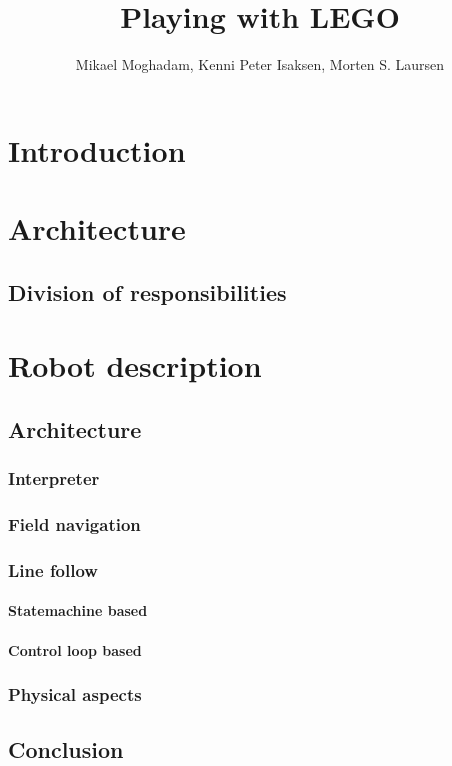 \documentclass[draft, english, a4paper]{article}
\title{Playing with LEGO}
\author{Mikael Moghadam, Kenni Peter Isaksen, Morten S. Laursen}
\begin{document}
\maketitle %


%
%
\chapter{Introduction}
\newpage
\chapter{Architecture}
	\section{Division of responsibilities}
\chapter{Robot description}
	\section{Architecture}
		\subsection{Interpreter} %
		\subsection{Field navigation} %
		\subsection{Line follow} %
			\subsubsection{Statemachine based}
			\subsubsection{Control loop based}
		\subsection{Physical aspects} %
	\section{Conclusion} %
\end{document}
